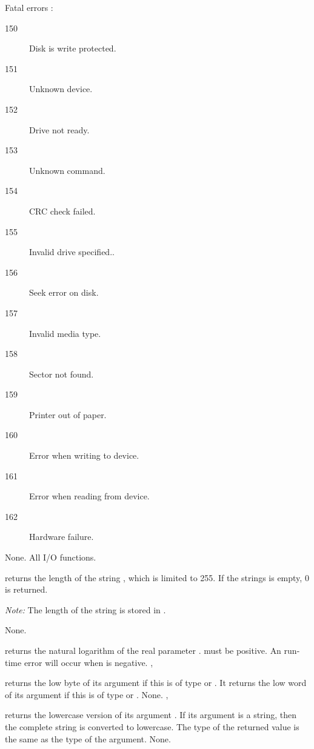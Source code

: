 \documentclass{report}
\begin{document}
{Fatal errors :

\begin{description}
\item [150\ ] Disk is write protected.
\item [151\ ] Unknown device.
\item [152\ ] Drive not ready.
\item [153\ ] Unknown command.
\item [154\ ] CRC check failed.
\item [155\ ] Invalid drive specified..
\item [156\ ] Seek error on disk.
\item [157\ ] Invalid media type.
\item [158\ ] Sector not found.
\item [159\ ] Printer out of paper.
\item [160\ ] Error when writing to device.
\item [161\ ] Error when reading from device.
\item [162\ ] Hardware failure.
\end{description}
}
{None.}
{All I/O functions.}



{ returns the length of the string ,
which is limited to 255. If the strings  is empty, 0 is returned.

{\em Note:} The length of the string  is stored in .
}
{None.}
{}



{
 returns the natural logarithm of the real parameter .
 must be positive.
}
{An run-time error will occur when  is negative.}
{, }



{ returns the low byte of its argument if this is of type
 or
. It returns the low word of its argument if this is of type 
 or .}
{None.}
{, }



{ returns the lowercase version of its argument .
If its argument is a string, then the complete string is converted to
lowercase. The type of the returned value is the same as the type of the
argument.}
{None.}
{}
\end{document}
